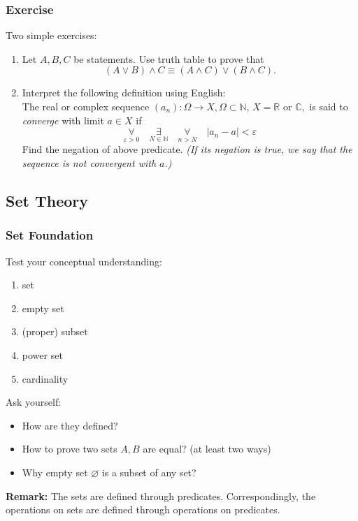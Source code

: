 \documentclass[10pt, t]{beamer}
\renewcommand{\emph}[1]{{\color{bladerunnerblue}\textsl{#1}}}
\newcommand{\weaken}[1]{{\color{weak}\textit{#1}}}
\renewcommand{\emptyset}{\varnothing}
\begin{document}
\begin{frame}
    \frametitle{Exercise}
    Two simple exercises:
    \begin{enumerate}
        \item Let $A,B,C$ be statements. Use truth table to prove that $$(A\vee B )\wedge C \equiv (A\wedge C)\vee (B\wedge C).$$
        \item Interpret the following definition using English: \\[8pt] The real or complex sequence $\left(a_{n}\right): \Omega \rightarrow X, \Omega \subset \mathbb{N}$, $X=\mathbb{R}$ or $\mathbb{C},$ is said to \emph{converge} with limit $a \in X$ if
              $$
                  \underset{\varepsilon>0}{\forall}\quad \underset{N \in \mathbb{N}}{\exists}\quad \underset{n>N}{\forall}\quad\left|a_{n}-a\right|<\varepsilon
              $$
              Find the negation of above predicate. \weaken{(If its negation is true, we say that the sequence is not convergent with $a$.)}
    \end{enumerate}
\end{frame}

\subsection{Set Theory}
\begin{frame}
    \frametitle{Set Foundation}
    Test your conceptual understanding:
    \begin{enumerate}
        \item set
        \item empty set
        \item (proper) subset
        \item power set
        \item cardinality
    \end{enumerate}
    Ask yourself:
    \begin{itemize}
        \item How are they defined?
        \item How to prove two sets $A, B$ are equal? (at least two ways)
        \item Why empty set $\emptyset$ is a subset of any set?
    \end{itemize}
    \pause
    \textbf{Remark:} The sets are defined through predicates. Correspondingly, the operations on sets are defined through operations on predicates.
\end{frame}
\end{document}
